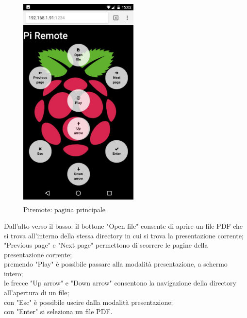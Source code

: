 \begin{figure}[h!]
\includegraphics[width=6cm, height=11cm]{../img/main-page}
\centering
\caption{Piremote: pagina principale}
\end{figure}

Dall'alto verso il basso:
il bottone "Open file" consente di aprire un file PDF che si trova all'interno della stessa directory in cui si trova la presentazione corrente;\\
"Previous page" e "Next page" permettono di scorrere le pagine della presentazione corrente;\\
premendo "Play" è possibile passare alla modalità presentazione, a schermo intero;\\
le frecce "Up arrow" e "Down arrow" consentono la navigazione della directory all'apertura di un file;\\
con "Esc" è possibile uscire dalla modalità presentazione;\\
con "Enter" si seleziona un file PDF.\\
